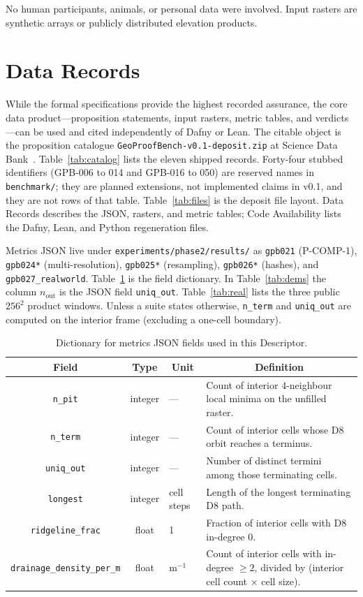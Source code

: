 \documentclass[11pt,a4paper]{article}
\newcommand{\thead}[1]{\multicolumn{1}{c}{#1}}
\begin{document}
No human participants, animals, or personal data were involved. Input
rasters are synthetic arrays or publicly distributed elevation products.

\section{Data Records}

While the formal specifications provide the highest recorded assurance,
the core data product---proposition statements, input rasters, metric
tables, and verdicts---can be used and cited independently of Dafny or
Lean. The citable object is the proposition catalogue
\texttt{GeoProofBench-v0.1\allowbreak-deposit.zip} at Science Data
Bank~\cite{gpbdata}. Table~\ref*{tab:catalog} lists the eleven shipped
records. Forty-four stubbed identifiers (GPB-006 to 014 and GPB-016 to
050) are reserved names in \texttt{benchmark/}; they are planned
extensions, not implemented claims in v0.1, and they are not rows of
that table. Table~\ref*{tab:files} is the deposit file layout. Data
Records describes the JSON, rasters, and metric tables; Code
Availability lists the Dafny, Lean, and Python regeneration files.

Metrics JSON live under
\texttt{experiments/phase2/results/} as \texttt{gpb021} (P-COMP-1),
\texttt{gpb024*} (multi-resolution), \texttt{gpb025*} (resampling),
\texttt{gpb026*} (hashes), and \texttt{gpb027\_realworld}.
Table~\ref*{tab:meta} is the field dictionary. In Table~\ref*{tab:dems}
the column $n_{\mathrm{out}}$ is the JSON field \texttt{uniq\_out}.
Table~\ref*{tab:real} lists the three public $256^{2}$ product windows.
Unless a suite states otherwise, \texttt{n\_term} and
\texttt{uniq\_out} are computed on the interior frame (excluding a
one-cell boundary).

\begin{table}[!htbp]
\centering
\caption{Dictionary for metrics JSON fields used in this Descriptor.}
\label{tab:meta}
\small
\begin{tabular}{ccm{1.6cm}m{6.8cm}}
\toprule
\thead{Field} & \thead{Type} & \thead{Unit} & \thead{Definition} \\
\midrule
\texttt{n\_pit} & integer & --- &
Count of interior 4-neighbour local minima on the unfilled raster. \\
\texttt{n\_term} & integer & --- &
Count of interior cells whose D8 orbit reaches a terminus. \\
\texttt{uniq\_out} & integer & --- &
Number of distinct termini among those terminating cells. \\
\texttt{longest} & integer & cell steps &
Length of the longest terminating D8 path. \\
\texttt{ridgeline\_frac} & float & 1 &
Fraction of interior cells with D8 in-degree 0. \\
\texttt{drainage\_density\_per\_m} & float & m$^{-1}$ &
Count of interior cells with in-degree $\ge 2$, divided by
(interior cell count $\times$ cell size). \\
\bottomrule
\end{tabular}
\end{table}
\end{document}
